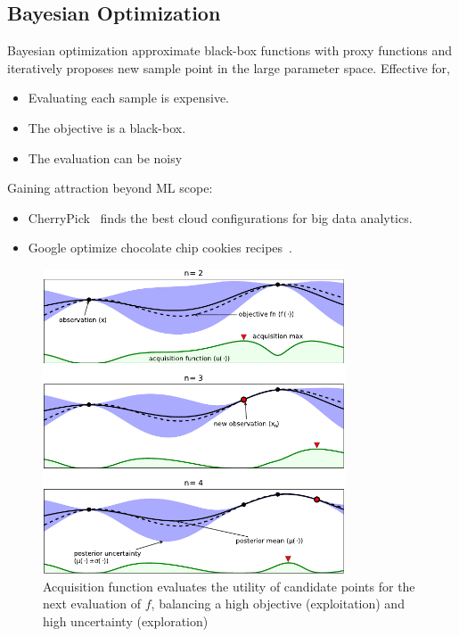 \subsection{Bayesian Optimization}
\label{sec:bo}

Bayesian optimization approximate black-box functions with proxy functions and
iteratively proposes new sample point in the large parameter space. Effective
for,

\begin{itemize}
\item Evaluating each sample is expensive.
\item The objective is a black-box.
\item The evaluation can be noisy
\end{itemize}

Gaining attraction beyond ML scope:
\begin{itemize}
\item CherryPick~\cite{alipourfard2017cherrypick} finds the best cloud
  configurations for big data analytics.
\item Google optimize chocolate chip cookies recipes~\cite{solnik2017bayesian}.
\end{itemize}

\begin{figure}
  \centering
  \includegraphics[width=0.8\textwidth]{figures/serving-bo-illustration.pdf}
  \caption{Acquisition function evaluates the utility of candidate points for
    the next evaluation of $f$, balancing a high objective (exploitation) and
    high uncertainty (exploration)~\cite{shahriari2016taking}}
\end{figure}

